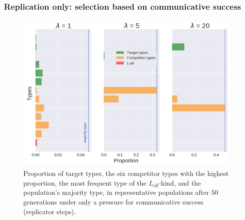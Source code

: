 \documentclass[a4paper, 11pt]{article}
\theoremstyle{Satz}
\newcommand{\mylang}[1]{\ensuremath{L_{\text{#1}}}\xspace} %
\newcommand{\Lall}{\mylang{all}}
\begin{document}
\subsubsection{Replication only: selection based on communicative success} 

\begin{figure}[t]
\centering
\includegraphics[width=\textwidth,height=8cm, keepaspectratio]{./plots/barh-onlyr}
\caption{Proportion of target types, the six competitor types with the highest proportion, the
  most frequent type of the $\Lall$-kind, and the population's majority type, in representative
  populations after $50$ generations under only a pressure for communicative success
  (replicator steps).}
\label{fig:only-R}
\end{figure}
\end{document}
